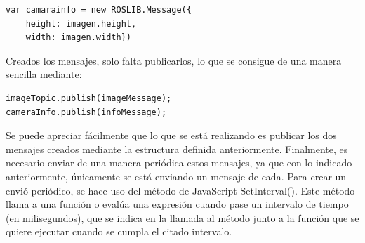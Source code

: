 \begin{lstlisting}[frame=single]
var camarainfo = new ROSLIB.Message({
	height: imagen.height,
	width: imagen.width})

\end{lstlisting}
Creados los mensajes, solo falta publicarlos, lo que se consigue de una manera sencilla mediante:
\begin{lstlisting}[frame=single]
imageTopic.publish(imageMessage);
cameraInfo.publish(infoMessage);
\end{lstlisting}
Se puede apreciar fácilmente que lo que se está realizando es publicar los dos mensajes creados mediante la estructura definida anteriormente. 
Finalmente, es necesario enviar de una manera periódica estos mensajes, ya que con lo indicado anteriormente, únicamente se está enviando un mensaje de cada. Para crear un envió periódico, se hace uso del método de JavaScript SetInterval(). Este método llama a una función o evalúa una expresión cuando pase un intervalo de tiempo (en milisegundos), que se indica en la llamada al método junto a la función que se quiere ejecutar cuando se cumpla el citado intervalo.

